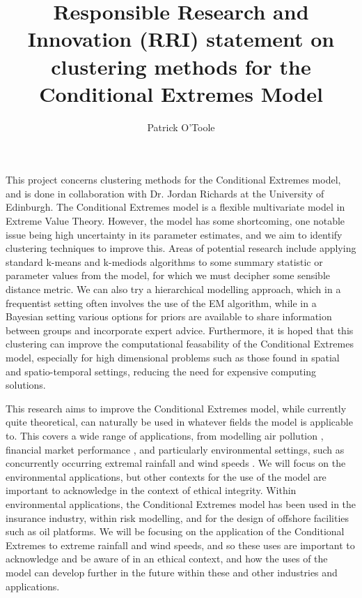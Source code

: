 \documentclass[a4paper]{article}
\title{Responsible Research and Innovation (RRI) statement on clustering methods for the Conditional Extremes Model}
\author{Patrick O'Toole}
\begin{document}
\maketitle
\noindent This project concerns clustering methods for the Conditional Extremes model, and is done in collaboration with Dr. Jordan Richards at the University of Edinburgh.
The Conditional Extremes model is a flexible multivariate model in Extreme Value Theory.
However, the model has some shortcoming, one notable issue being high uncertainty in its parameter estimates, and we aim to identify clustering techniques to improve this. 
Areas of potential research include applying standard k-means and k-mediods algorithms to some summary statistic or parameter values from the model, for which we must decipher some sensible distance metric. 
We can also try a hierarchical modelling approach, which in a frequentist setting often involves the use of the EM algorithm, while in a Bayesian setting various options for priors are available to share information between groups and incorporate expert advice. 
Furthermore, it is hoped that this clustering can improve the computational feasability of the Conditional Extremes model, especially for high dimensional problems such as those found in spatial and spatio-temporal settings, reducing the need for expensive computing solutions.
\hfill \break

\noindent This research aims to improve the Conditional Extremes model, while currently quite theoretical, can naturally be used in whatever fields the model is applicable to. 
This covers a wide range of applications, from modelling air pollution \cite{Tawn2018}, financial market performance \cite{Nolde2018}, and particularly environmental settings, such as concurrently occurring extremal rainfall and wind speeds \cite{Vignotto2021}.
We will focus on the environmental applications, but other contexts for the use of the model are important to acknowledge in the context of ethical integrity. 
Within environmental applications, the Conditional Extremes model has been used in the insurance industry, within risk modelling, and for the design of offshore facilities such as oil platforms. 
We will be focusing on the application of the Conditional Extremes to extreme rainfall and wind speeds, and so these uses are important to acknowledge and be aware of in an ethical context, and how the uses of the model can develop further in the future within these and other industries and applications. 
\hfill \break
\end{document}

